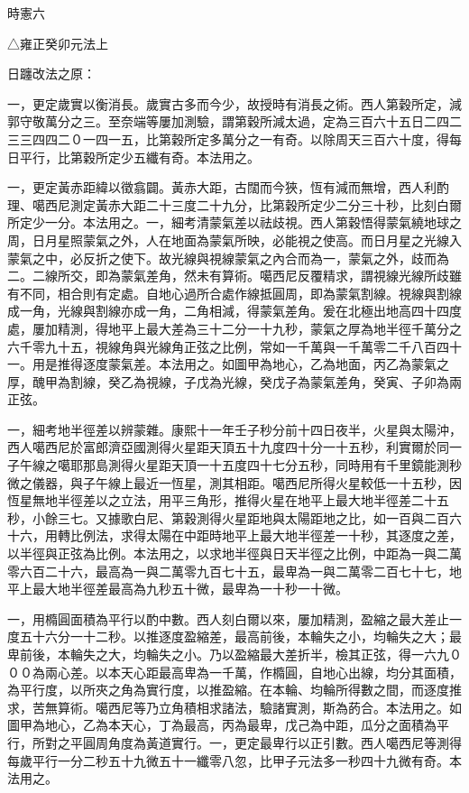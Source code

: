 
\begin{pinyinscope}
時憲六

△雍正癸卯元法上

日躔改法之原：

一，更定歲實以衡消長。歲實古多而今少，故授時有消長之術。西人第穀所定，減郭守敬萬分之三。至奈端等屢加測驗，謂第穀所減太過，定為三百六十五日二四二三三四四二０一四一五，比第穀所定多萬分之一有奇。以除周天三百六十度，得每日平行，比第穀所定少五纖有奇。本法用之。

一，更定黃赤距緯以徵翕闢。黃赤大距，古闊而今狹，恆有減而無增，西人利酌理、噶西尼測定黃赤大距二十三度二十九分，比第穀所定少二分三十秒，比刻白爾所定少一分。本法用之。一，細考清蒙氣差以祛歧視。西人第穀悟得蒙氣繞地球之周，日月星照蒙氣之外，人在地面為蒙氣所映，必能視之使高。而日月星之光線入蒙氣之中，必反折之使下。故光線與視線蒙氣之內合而為一，蒙氣之外，歧而為二。二線所交，即為蒙氣差角，然未有算術。噶西尼反覆精求，謂視線光線所歧雖有不同，相合則有定處。自地心過所合處作線抵圓周，即為蒙氣割線。視線與割線成一角，光線與割線亦成一角，二角相減，得蒙氣差角。爰在北極出地高四十四度處，屢加精測，得地平上最大差為三十二分一十九秒，蒙氣之厚為地半徑千萬分之六千零九十五，視線角與光線角正弦之比例，常如一千萬與一千萬零二千八百四十一。用是推得逐度蒙氣差。本法用之。如圖甲為地心，乙為地面，丙乙為蒙氣之厚，醜甲為割線，癸乙為視線，子戊為光線，癸戊子為蒙氣差角，癸寅、子卯為兩正弦。

一，細考地半徑差以辨蒙雜。康熙十一年壬子秒分前十四日夜半，火星與太陽沖，西人噶西尼於富郎濟亞國測得火星距天頂五十九度四十分一十五秒，利實爾於同一子午線之噶耶那島測得火星距天頂一十五度四十七分五秒，同時用有千里鏡能測秒微之儀器，與子午線上最近一恆星，測其相距。噶西尼所得火星較低一十五秒，因恆星無地半徑差以之立法，用平三角形，推得火星在地平上最大地半徑差二十五秒，小餘三七。又據歌白尼、第穀測得火星距地與太陽距地之比，如一百與二百六十六，用轉比例法，求得太陽在中距時地平上最大地半徑差一十秒，其逐度之差，以半徑與正弦為比例。本法用之，以求地半徑與日天半徑之比例，中距為一與二萬零六百二十六，最高為一與二萬零九百七十五，最卑為一與二萬零二百七十七，地平上最大地半徑差最高為九秒五十微，最卑為一十秒一十微。

一，用橢圓面積為平行以酌中數。西人刻白爾以來，屢加精測，盈縮之最大差止一度五十六分一十二秒。以推逐度盈縮差，最高前後，本輪失之小，均輪失之大；最卑前後，本輪失之大，均輪失之小。乃以盈縮最大差折半，檢其正弦，得一六九０００為兩心差。以本天心距最高卑為一千萬，作橢圓，自地心出線，均分其面積，為平行度，以所夾之角為實行度，以推盈縮。在本輪、均輪所得數之間，而逐度推求，苦無算術。噶西尼等乃立角積相求諸法，驗諸實測，斯為菂合。本法用之。如圖甲為地心，乙為本天心，丁為最高，丙為最卑，戊己為中距，瓜分之面積為平行，所對之平圓周角度為黃道實行。一，更定最卑行以正引數。西人噶西尼等測得每歲平行一分二秒五十九微五十一纖零八忽，比甲子元法多一秒四十九微有奇。本法用之。


\end{pinyinscope}
